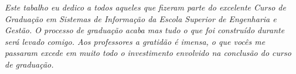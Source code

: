 \begin{dedicatoria}
   \vspace*{\fill}
   \centering
   \noindent
   \textit{ Este tabalho eu dedico a todos aqueles que fizeram parte do excelente Curso de Graduação em Sistemas de Informação da Escola Superior de Engenharia e Gestão. O processo de graduação acaba mas tudo o que foi construído durante será levado comigo. Aos professores a gratidão é imensa, o que vocês me passaram excede em muito todo o investimento envolvido na conclusão do curso de graduação.
   } \vspace*{\fill}
\end{dedicatoria}
